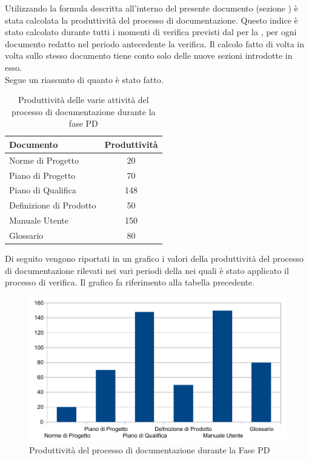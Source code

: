 			Utilizzando la formula descritta all'interno del presente documento (sezione ) è stata calcolata la produttività del processo di documentazione. Questo indice è stato calcolato durante tutti i momenti di verifica previsti dal  per la , per ogni documento redatto nel periodo antecedente la verifica. Il calcolo fatto di volta in volta sullo stesso documento tiene conto solo delle nuove sezioni introdotte in esso.\\
			Segue un riassunto di quanto è stato fatto.
			\begin{table}[H]
			      \centering
					\begin{tabu}{| l | c |}
					\hline
					Documento & Produttività	\\ \hline
					Norme di Progetto	& 20 \\ \hline
					Piano di Progetto	& 70 \\ \hline
					Piano di Qualifica	& 148 \\ \hline
					Definizione di Prodotto & 50 \\ \hline
					Manuale Utente & 150 \\ \hline
					Glossario & 80 \\ \hline
					\end{tabu}
					\caption{Produttività delle varie attività del processo di documentazione durante la fase PD}
			\end{table}
			Di seguito vengono riportati in un grafico i valori della produttività del processo di documentazione rilevati nei vari periodi della  nei quali è stato applicato il processo di verifica. Il grafico fa riferimento alla tabella precedente.\\

			\begin{figure}[H]
				\centering
					\includegraphics[width=12cm]{PianoDiQualifica/Pics/ProduttivitaDocumentazioneFasePD.pdf}
				\caption{Produttività del processo di documentazione durante la Fase PD}
			\end{figure}

